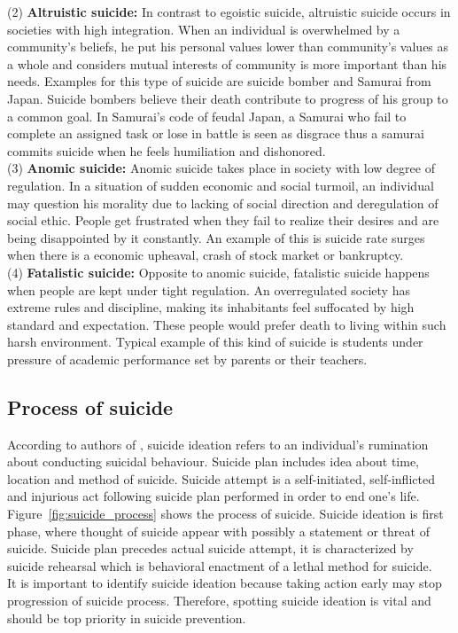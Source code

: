 (2) \textbf{Altruistic suicide:} In contrast to egoistic suicide, altruistic suicide occurs in societies with high integration. When an individual is overwhelmed by a community's beliefs, he put his personal values lower than community's values as a whole and considers mutual interests of community is more important than his needs. Examples for this type of suicide are suicide bomber and Samurai from Japan. Suicide bombers believe their death contribute to progress of his group to a common goal. In Samurai's code of feudal Japan, a Samurai who fail to complete an assigned task or lose in battle is seen as disgrace thus a samurai commits suicide when he feels humiliation and dishonored.\\
(3) \textbf{Anomic suicide:} Anomic suicide takes place in society with low degree of regulation. In a situation of sudden economic and social turmoil, an individual may question his morality due to lacking of social direction and deregulation of social ethic. People get frustrated when they fail to realize their desires and are being disappointed by it constantly. An example of this is suicide rate surges when there is a economic upheaval, crash of stock market or bankruptcy.\\
(4) \textbf{Fatalistic suicide:} Opposite to anomic suicide, fatalistic suicide happens when people are kept under tight regulation. An overregulated society has extreme rules and discipline, making its inhabitants feel suffocated by high standard and expectation. These people would prefer death to living within such harsh environment. Typical example of this kind of suicide is students under pressure of academic performance set by parents or their teachers.\\

\subsection*{Process of suicide}
According to authors of \cite{O'Carroll1996}, suicide ideation refers to an individual's rumination about conducting suicidal behaviour. Suicide plan includes idea about time, location and method of suicide. Suicide attempt is a self-initiated, self-inflicted and injurious act following suicide plan performed in order to end one's life.\\
Figure~\ref{fig:suicide_process} shows the process of suicide. Suicide ideation is first phase, where thought of suicide appear with possibly a statement or threat of suicide. Suicide plan precedes actual suicide attempt, it is characterized by suicide rehearsal which is behavioral enactment of a lethal method for suicide.\\
It is important to identify suicide ideation because taking action early may stop progression of suicide process. Therefore, spotting suicide ideation is vital and should be top priority in suicide prevention.
 
